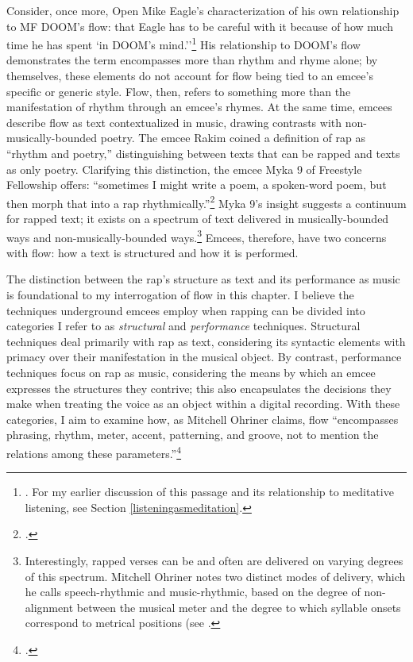 Consider, once more, Open Mike Eagle's characterization of his own relationship to MF 
DOOM's flow: that Eagle has to be careful with it because of how much time he has spent
`in DOOM's mind.''\footnote{
    \cite{estellecaswellRappingDeconstructedBest2016}. For my earlier discussion of this
    passage and its relationship to meditative listening,  see Section 
    \ref{listeningasmeditation}.} 
His relationship to DOOM's flow demonstrates the term encompasses more than rhythm and 
rhyme alone; by themselves, these elements do not account for flow being tied to an emcee's
specific or generic style. Flow, then, refers to something more than the manifestation of 
rhythm through an emcee's rhymes. At the same time, emcees describe flow as text contextualized
in music, drawing contrasts with non-musically-bounded poetry. The emcee Rakim coined a
definition of rap as ``rhythm and poetry,'' distinguishing between texts that can be rapped 
and texts as only poetry. Clarifying this distinction, the emcee Myka 9 of Freestyle Fellowship
offers: ``sometimes I might write a poem, a spoken-word poem, but then morph that into a rap
rhythmically.''\footnote{
    \autocite[63]{pauledwardsHowRapArt2009}.}
Myka 9's insight suggests a continuum for rapped text; it exists on a spectrum of text delivered
in musically-bounded ways and non-musically-bounded ways.\footnote{
    Interestingly, rapped verses can be and often are delivered on varying degrees of this
    spectrum. Mitchell Ohriner notes two distinct modes of delivery, which he calls speech-rhythmic
    and music-rhythmic, based on the degree of non-alignment between the musical meter and the 
    degree to which syllable onsets correspond to metrical positions (see 
    \cite{mitchellohrinerLyricRhythmNonalignment2019}.}
Emcees, therefore, have two concerns with flow: how a text is structured and how it is performed.

The distinction between the rap's structure as text and its performance as music is foundational
to my interrogation of flow in this chapter. I believe the techniques underground emcees employ 
when rapping can be divided into  categories I refer to as \emph{structural} and \emph{performance}
techniques. Structural techniques deal primarily with rap as text, considering its syntactic 
elements with primacy over their manifestation in the musical object. By contrast, performance
techniques focus on rap as music, considering the means by which an emcee expresses the structures
they contrive; this also encapsulates the decisions they make when treating the voice as an object
within a digital recording. With these categories, I aim to examine how, as Mitchell Ohriner claims,
flow ``encompasses phrasing, rhythm, meter, accent, patterning, and groove, not to mention the 
relations among these parameters.''\footnote{
    \autocite[28]{mitchellohrinerFlowRhythmicVoice2019}.}

